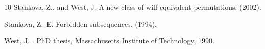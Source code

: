 \documentclass[12pt, english, a4paper]{article}
\theoremstyle{plain}
\theoremstyle{definition}
\theoremstyle{remark}
\begin{document}
\begin{thebibliography}{10}
{\sc Stankova, Z., and West, J.}
\newblock A new class of wilf-equivalent permutations.
 (2002).

{\sc Stankova, Z.~E.}
\newblock Forbidden subsequences.
 (1994).

{\sc West, J.}
.
\newblock PhD thesis, Massachusetts Institute of Technology, 1990.

\end{thebibliography}


% 

\end{document}
